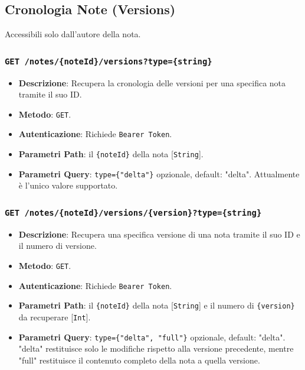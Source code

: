 \documentclass[11pt]{article}
\begin{document}
\subsection{Cronologia Note (Versions)}
Accessibili solo dall'autore della nota.
\subsubsection{\texttt{GET /notes/\{noteId\}/versions?type=\{string\}}}
\begin{itemize}
    \item \textbf{Descrizione}: Recupera la cronologia delle versioni per una specifica nota tramite il suo ID.
    \item \textbf{Metodo}: \texttt{GET}.
    \item \textbf{Autenticazione}: Richiede \texttt{Bearer Token}.
    \item \textbf{Parametri Path}: il \texttt{\{noteId\}} della nota [\texttt{String}].
    \item \textbf{Parametri Query}: \texttt{type=\{"delta"\}} opzionale, default: "delta". Attualmente è l'unico valore supportato.
\end{itemize}

\subsubsection{\texttt{GET /notes/\{noteId\}/versions/\{version\}?type=\{string\}}}
\begin{itemize}
    \item \textbf{Descrizione}: Recupera una specifica versione di una nota tramite il suo ID e il numero di versione.
    \item \textbf{Metodo}: \texttt{GET}.
    \item \textbf{Autenticazione}: Richiede \texttt{Bearer Token}.
    \item \textbf{Parametri Path}: il \texttt{\{noteId\}} della nota [\texttt{String}] e il numero di \texttt{\{version\}} da recuperare [\texttt{Int}].
    \item \textbf{Parametri Query}: \texttt{type=\{"delta", "full"\}} opzionale, default: "delta".  "delta" restituisce solo le modifiche rispetto alla versione precedente, mentre "full" restituisce il contenuto completo della nota a quella versione.
\end{itemize}
\end{document}
